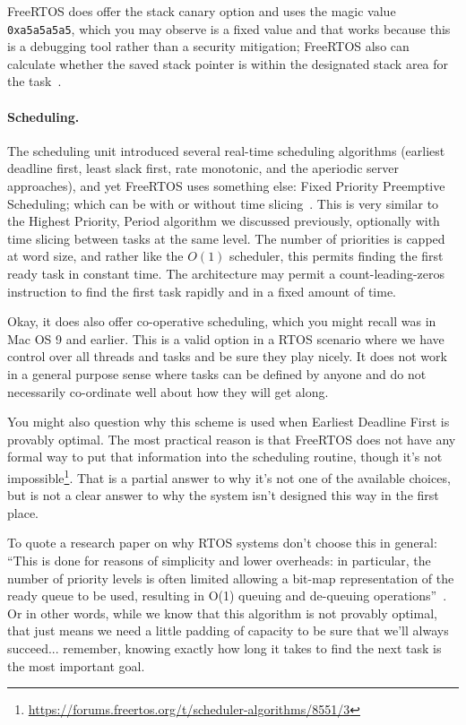 FreeRTOS does offer the stack canary option and uses the magic value \texttt{0xa5a5a5a5}, which you may observe is a fixed value and that works because this is a debugging tool rather than a security mitigation; FreeRTOS also can calculate whether the saved stack pointer is within the designated stack area for the task~\cite{freertos}. 
 
\paragraph{Scheduling.} The scheduling unit introduced several real-time scheduling algorithms (earliest deadline first, least slack first, rate monotonic, and the aperiodic server approaches), and yet FreeRTOS uses something else: Fixed Priority Preemptive Scheduling; which can be with or without time slicing~\cite{freertos}. This is very similar to the Highest Priority, Period algorithm we discussed previously, optionally with time slicing between tasks at the same level. The number of priorities is capped at word size, and rather like the $O(1)$ scheduler, this permits finding the first ready task in constant time. The architecture may permit a count-leading-zeros instruction to find the first task rapidly and in a fixed amount of time.

Okay, it does also offer co-operative scheduling, which you might recall was in Mac OS 9 and earlier. This is a valid option in a RTOS scenario where we have control over all threads and tasks and be sure they play nicely. It does not work in a general purpose sense where tasks can be defined by anyone and do not necessarily co-ordinate well about how they will get along.

You might also question why this scheme is used when Earliest Deadline First is provably optimal. The most practical reason is that FreeRTOS does not have any formal way to put that information into the scheduling routine, though it's not impossible\footnote{ \url{https://forums.freertos.org/t/scheduler-algorithms/8551/3} }. That is a partial answer to why it's not one of the available choices, but is not a clear answer to why the system isn't designed this way in the first place.

To quote a research paper on why RTOS systems don't choose this in general: ``This is done for reasons of simplicity and lower overheads: in particular, the number of priority levels is often limited allowing a bit-map representation of the ready queue to be used, resulting in O(1) queuing and de-queuing operations''~\cite{fp-vs-edf}. Or in other words, while we know that this algorithm is not provably optimal, that just means we need a little padding of capacity to be sure that we'll always succeed... remember, knowing exactly how long it takes to find the next task is the most important goal.


